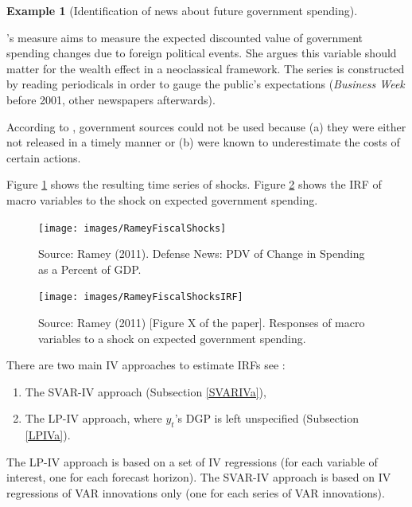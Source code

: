\documentclass[
  12pt,
]{book}
\providecommand{\tightlist}{%
  \setlength{\itemsep}{0pt}\setlength{\parskip}{0pt}}
\theoremstyle{definition}
\theoremstyle{definition}
\newtheorem{example}{Example}[chapter]
\theoremstyle{definition}
\theoremstyle{definition}
\theoremstyle{remark}
\begin{document}
\begin{example}[Identification of news about future government spending]
\protect\hypertarget{exm:RameyQJE2011}{}\label{exm:RameyQJE2011}

\citet{Ramey_2011}'s measure aims to measure the expected discounted value of government spending changes due to foreign political events. She argues this variable should matter for the wealth effect in a neoclassical framework. The series is constructed by reading periodicals in order to gauge the public's expectations (\emph{Business Week} before 2001, other newspapers afterwards).

According to \citet{Ramey_2011}, government sources could not be used because (a) they were either not released in a timely manner or (b) were known to underestimate the costs of certain actions.

Figure \ref{fig:RameyFiscalShocks} shows the resulting time series of shocks. Figure \ref{fig:IRFfiscalRamey} shows the IRF of macro variables to the shock on expected government spending.

\begin{figure}
\texttt{[image: images/RameyFiscalShocks]} \caption{Source: Ramey (2011). Defense News: PDV of Change in Spending as a Percent of GDP.}\label{fig:RameyFiscalShocks}
\end{figure}

\begin{figure}
\texttt{[image: images/RameyFiscalShocksIRF]} \caption{Source: Ramey (2011) [Figure X of the paper]. Responses of macro variables to a shock on expected government spending.}\label{fig:IRFfiscalRamey}
\end{figure}

\end{example}

There are two main IV approaches to estimate IRFs see \citet{Stock_Watson_2018}:

\begin{enumerate}
\def\labelenumi{\alph{enumi}.}
\tightlist
\item
  The SVAR-IV approach (Subsection \ref{SVARIVa}),
\item
  The LP-IV approach, where \(y_t\)'s DGP is left unspecified (Subsection \ref{LPIVa}).
\end{enumerate}

The LP-IV approach is based on a set of IV regressions (for each variable of interest, one for each forecast horizon). The SVAR-IV approach is based on IV regressions of VAR innovations only (one for each series of VAR innovations).
\end{document}

